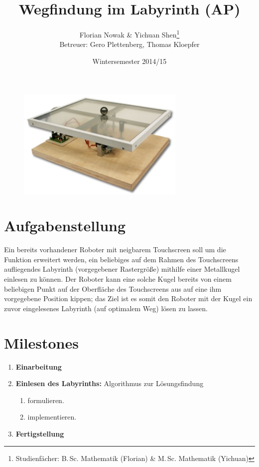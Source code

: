 \documentclass[ngerman]{article}
\title{Wegfindung im Labyrinth (AP)}
\author{
    Florian Nowak \& Yichuan Shen\footnote{Studienfächer: B.\,Sc. Mathematik (Florian) \&  M.\,Sc. Mathematik (Yichuan)}\\
    Betreuer: Gero Plettenberg, Thomas Kloepfer
}
\date{Wintersemester 2014/15}
\begin{document}

\maketitle

\begin{figure}[h]
    \centering
    \includegraphics[scale=.5]{platzhalter}
\end{figure}

\section*{Aufgabenstellung}

Ein bereits vorhandener Roboter mit neigbarem Touchscreen soll um die Funktion erweitert werden, ein beliebiges auf dem Rahmen des Touchscreens aufliegendes Labyrinth (vorgegebener Rastergröße) mithilfe einer Metallkugel einlesen zu können. Der Roboter kann eine solche Kugel bereits von einem beliebigen Punkt auf der Oberfläche des Touchscreens aus auf eine ihm vorgegebene Position kippen; das Ziel ist es somit den Roboter mit der Kugel ein zuvor eingelesenes Labyrinth (auf optimalem Weg) lösen zu lassen.

\section*{Milestones}
\begin{enumerate}
    \item[\textbf{1.}] \textbf{Einarbeitung}
    \item[\textbf{2.}] \textbf{Einlesen des Labyrinths:} Algorithmus zur Lösungsfindung
        \begin{enumerate}
        \item[\textbf{a)}] formulieren.
        \item[\textbf{b)}] implementieren.
        \end{enumerate}
    \item[\textbf{3.}] \textbf{Fertigstellung}
\end{enumerate}
\end{document}
